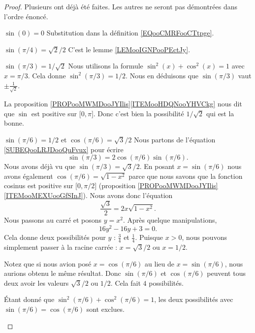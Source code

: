 \begin{proof}
	Plusieurs ont déjà été faites. Les autres ne seront pas démontrées dans l'ordre énoncé.
	\begin{subproof}
		\item[$\sin(0)=0$]
		Substitution dans la définition \eqref{EQooCMRFooCTtpge}.
		\item[$ \sin(\pi/4)=\sqrt{ 2 }/2$]
		C'est le lemme \ref{LEMooIGNPooPEctJy}.
		\item[$ \sin(\pi/3)=1/\sqrt{ 2 }$]
		Nous utilisons la formule \( \sin^2(x)+\cos^2(x)=1\) avec \( x=\pi/3\). Cela donne \( \sin^2(\pi/3)=1/2\). Nous en déduisons que \( \sin(\pi/3)\) vaut \( \pm\frac{1}{ \sqrt{ 2 } }\).

		La proposition \ref{PROPooMWMDooJYIlis}\ref{ITEMooHDQNooYHVCkg} nous dit que \( \sin\) est positive sur \(\mathopen[ 0 , \pi \mathclose]\). Donc c'est bien la possibilité \( 1/\sqrt{ 2 }\) qui est la bonne.
		\item[$\sin(\pi/6)=1/2$ et $\cos(\pi/6)=\sqrt{ 3 }/2 $]
		Nous partons de l'équation \eqref{SUBEQooLRJDooQuFvux} pour écrire
		\begin{equation}
			\sin(\pi/3)=2\cos(\pi/6)\sin(\pi/6).
		\end{equation}
		Nous avons déjà vu que \( \sin(\pi/3)=\sqrt{ 3 }/2\). En posant \( x=\sin(\pi/6)\) nous avons également \( \cos(\pi/6)=\sqrt{ 1-x^2 }\) parce que nous savons que la fonction cosinus est positive sur \( \mathopen[ 0 , \pi/2 \mathclose]\) (proposition \ref{PROPooMWMDooJYIlis}\ref{ITEMooMEXUooGfSInJ}). Nous avons donc l'équation
		\begin{equation}
			\frac{ \sqrt{ 3 } }{2}=2x\sqrt{ 1-x^2 }.
		\end{equation}
		Nous passons au carré et posons \( y=x^2\). Après quelque manipulations,
		\begin{equation}
			16y^2-16y+3=0.
		\end{equation}
		Cela donne deux possibilités pour \( y\) : \( \frac{ 3 }{ 4 }\) et \( \frac{1}{ 4 }\). Puisque \( x>0\), nous pouvons simplement passer à la racine carrée : \( x=\sqrt{ 3 }/2\) ou \( x=1/2\).

		Notez que si nous avion posé \( x=\cos(\pi/6)\) au lieu de \( x=\sin(\pi/6)\), nous aurions obtenu le même résultat. Donc \( \sin(\pi/6)\) et \( \cos(\pi/6)\) peuvent tous deux avoir les valeurs \( \sqrt{ 3 }/2\) ou \( 1/2\). Cela fait \( 4\) possibilités.

		Étant donné que \( \sin^2(\pi/6)+\cos^2(\pi/6)=1\), les deux possibilités avec \( \sin(\pi/6)=\cos(\pi/6)\) sont exclues.


\end{subproof}
\end{proof}
